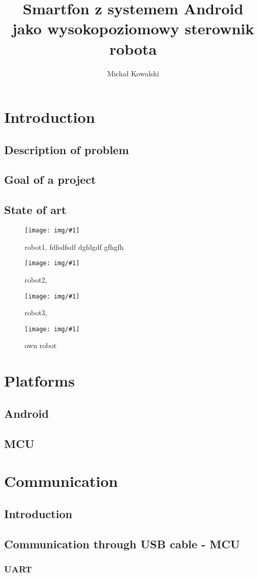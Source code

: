 \documentclass[openany]{mgr} %
\author{Michał Kowalski} %
\title{Smartfon z systemem Android\\jako wysokopoziomowy sterownik robota}
\newcommand{\includeimage}[2]{
\begin{figure}
\centering
\texttt{[image: img/\#1]}
\caption{#2}
\label{result:#1}
\end{figure}
}
\begin{document}
\maketitle
\tableofcontents

\chapter{Introduction}

\section{Description of problem}

\section{Goal of a project}

\section{State of art}

\includeimage{SoA1}{robot1, \cite{SoA1} fdfsdfsdf dgfdgdf  gfhgfh }
\includeimage{SoA2}{robot2, \cite{SoA2}}
\includeimage{SoA3}{robot3, \cite{SoA3}}
\includeimage{SoA0}{own robot}

\chapter{Platforms}
\section{Android}
\section{MCU}

\chapter{Communication}

\section{Introduction}

\section{Communication through USB cable - MCU}
\subsection{UART}
\end{document}
